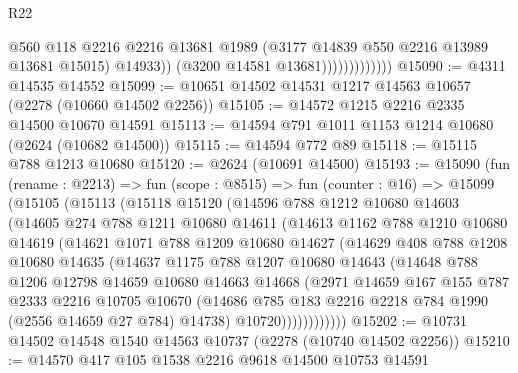 \begin{lexlean}{R22}
\begin{coremodule}
                                @560
                                @118
                                @2216
                                @2216
                                @13681
                                @1989
                                (@3177 @14839 @550 @2216 @13989 @13681 @15015)
                                @14933))
                            (@3200 @14581 @13681)))))))))))))
@15090 := @4311 @14535 @14552
@15099 := @10651 @14502 @14531 @1217 @14563 @10657 (@2278 (@10660 @14502 @2256))
@15105 := @14572 @1215 @2216 @2335 @14500 @10670 @14591
@15113 := @14594 @791 @1011 @1153 @1214 @10680 (@2624 (@10682 @14500))
@15115 := @14594 @772 @89
@15118 := @15115 @788 @1213 @10680
@15120 := @2624 (@10691 @14500)
@15193 := @15090
    (fun (rename : @2213) =>
    fun (scope : @8515) =>
    fun (counter : @16) =>
    @15099
      (@15105
        (@15113
          (@15118
            @15120
            (@14596
              @788
              @1212
              @10680
              @14603
              (@14605
                @274
                @788
                @1211
                @10680
                @14611
                (@14613
                  @1162
                  @788
                  @1210
                  @10680
                  @14619
                  (@14621
                    @1071
                    @788
                    @1209
                    @10680
                    @14627
                    (@14629
                      @408
                      @788
                      @1208
                      @10680
                      @14635
                      (@14637
                        @1175
                        @788
                        @1207
                        @10680
                        @14643
                        (@14648
                          @788
                          @1206
                          @12798
                          @14659
                          @10680
                          @14663
                          @14668
                          (@2971
                            @14659
                            @167
                            @155
                            @787
                            @2333
                            @2216
                            @10705
                            @10670
                            (@14686 @785 @183 @2216 @2218 @784 @1990 (@2556 @14659 @27 @784) @14738)
                            @10720))))))))))))
@15202 := @10731 @14502 @14548 @1540 @14563 @10737 (@2278 (@10740 @14502 @2256))
@15210 := @14570 @417 @105 @1538 @2216 @9618 @14500 @10753 @14591

\end{coremodule}
\end{lexlean}
